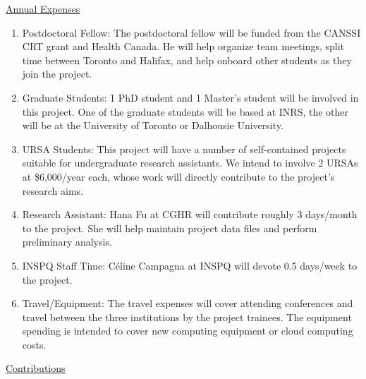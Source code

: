 \documentclass[12pt,letterpaper]{article}
\begin{document}
\underline{Annual Expenses}

\begin{enumerate}
    \item Postdoctoral Fellow: The postdoctoral fellow will be funded from the CANSSI CRT grant and Health Canada. He will help organize team meetings, split time between Toronto and Halifax, and help onboard other students as they join the project. 
    
    \item Graduate Students: 1 PhD student and 1 Master's student will be involved in this project. One of the graduate students will be based at INRS, the other will be at the University of Toronto or Dalhousie University.  

    \item URSA Students: This project will have a number of self-contained projects suitable for undergraduate research assistants. We intend to involve 2 URSAs at \$6,000/year each, whose work will directly contribute to the project's research aims.
    
    \item Research Assistant: Hana Fu at CGHR will contribute roughly 3 days/month to the project. She will help maintain project data files and perform preliminary analysis. 
    
    \item INSPQ Staff Time: Céline Campagna at INSPQ will devote 0.5 days/week to the project. 
    
    \item Travel/Equipment: The travel expenses will cover attending conferences and travel between the three institutions by the project trainees. The equipment spending is intended to cover new computing equipment or cloud computing costs. 
\end{enumerate}

\underline{Contributions}
\end{document}
